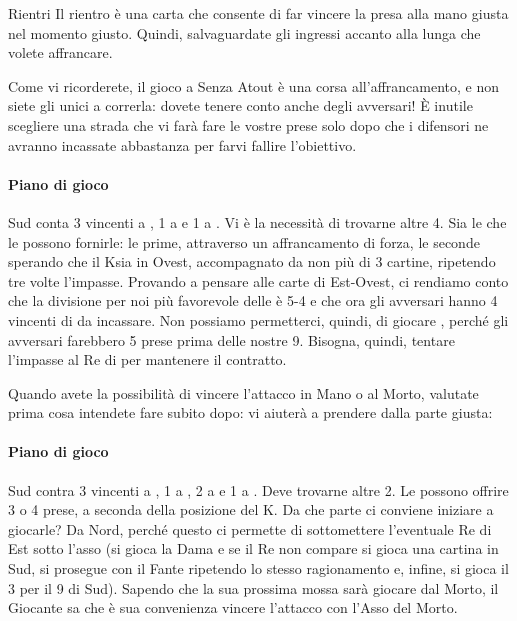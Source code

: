 \documentclass[../corsofiori.tex]{subfiles}
\begin{document}
\begin{regola}{Rientri}
    Il rientro è una carta che consente di far vincere la presa alla mano giusta nel momento giusto. Quindi,
    salvaguardate gli ingressi accanto alla lunga che volete affrancare.
\end{regola}


Come vi ricorderete, il gioco a Senza Atout è una corsa all'affrancamento, e non siete gli unici a correrla: dovete
tenere conto anche degli avversari! \`E inutile scegliere una strada che vi farà fare le vostre prese solo dopo che
i difensori ne avranno incassate abbastanza per farvi fallire l'obiettivo.

\newgame
{}
\leftupper{\boardtext*}%
{\dealertext\quad}{\vulnertext}

\showAll*

\paragraph{Piano di gioco} Sud conta 3 vincenti a \pic, 1 a \cu e 1 a \qu. Vi è la necessità di trovarne altre 4. Sia le
\fio che le \qu possono fornirle: le prime, attraverso un affrancamento di forza, le seconde sperando che il K\Di sia in
Ovest, accompagnato da non più di 3 cartine, ripetendo tre volte l'impasse.
Provando a pensare alle carte di Est-Ovest, ci rendiamo conto che la divisione per noi più favorevole delle \cu è 5-4
e che ora gli avversari hanno 4 vincenti di \cu da incassare. Non possiamo permetterci, quindi, di giocare \fio, perché
gli avversari farebbero 5 prese prima delle nostre 9. Bisogna, quindi, tentare l'impasse al Re di \qu per mantenere il
contratto.

Quando avete la possibilità di vincere l'attacco in Mano o al Morto, valutate prima cosa intendete fare subito dopo: vi
aiuterà a prendere dalla parte giusta:

\newgame
{}
\leftupper{\boardtext*}%
{\dealertext\quad}{\vulnertext}
\rightlower[2ex]{\lead: 2\Di}{}{}

\showAll*

\paragraph{Piano di gioco} Sud contra 3 vincenti a \pic, 1 a \cu, 2 a \qu e 1 a \fio. Deve trovarne altre 2. Le \fio
possono offrire 3 o 4 prese, a seconda della posizione del K\Cl. Da che parte ci conviene iniziare a giocarle? Da Nord,
perché questo ci permette di sottomettere l'eventuale Re di Est sotto l'asso (si gioca la Dama e se il Re non compare si
gioca una cartina in Sud, si prosegue con il Fante ripetendo lo stesso ragionamento e, infine, si gioca il 3 per il 9 di
Sud). Sapendo che la sua prossima mossa sarà giocare \fio dal Morto, il Giocante sa che è sua convenienza vincere
l'attacco con l'Asso del Morto.
\end{document}
